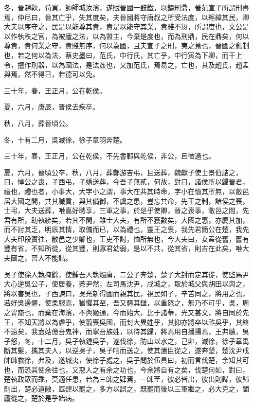 \begin{pinyinscope}
冬，晉趙鞅，荀寅，帥師城汝濱，遂賦晉國一鼓鐵，以鑄刑鼎，著范宣子所謂刑書焉，仲尼曰，晉其亡乎，失其度矣，夫晉國將守唐叔之所受法度，以經緯其民，卿大夫以序守之，民是以能尊其貴，貴是以能守其業，貴賤不愆，所謂度也，文公是以作執秩之官，為被廬之法，以為盟主，今棄是度也，而為刑鼎，民在鼎矣，何以尊貴，貴何業之守，貴賤無序，何以為國，且夫宣子之刑，夷之蒐也，晉國之亂制也，若之何以為法，蔡史墨曰，范氏，中行氏，其亡乎，中行寅為下卿，而干上令，擅作刑器，以為國法，是法姦也，又加范氏，焉易之，亡也，其及趙氏，趙孟與焉，然不得已，若德可以免。

三十年，春，王正月，公在乾侯。

夏，六月，庚辰，晉侯去疾卒。

秋，八月，葬晉頃公。

冬，十有二月，吳滅徐，徐子章羽奔楚。

三十年，春，王正月，公在乾侯，不先書鄆與乾侯，非公，且徵過也。

夏，六月，晉頃公卒，秋，八月，葬鄭游吉弔，且送葬，魏獻子使士景伯詰之，曰，悼公之喪，子西弔，子蟜送葬，今吾子無貳，何故，對曰，諸侯所以歸晉君，禮也，禮也者，小事大，大字小之謂，事大在共其時命，字小在恤其所無，以敝邑居大國之間，共其職貢，與其備御，不虞之患，豈忘共命，先王之制，諸侯之喪，士弔，大夫送葬，唯嘉好聘享，三軍之事，於是乎使卿，晉之喪事，敝邑之間，先君有所，助執紼矣，若其不間，雖士大夫，有所不獲數矣，大國之惠，亦慶其加，而不討其乏，明厎其情，取備而已，以為禮也，靈王之喪，我先君簡公在楚，我先大夫印段實往，敝邑之少卿也，王吏不討，恤所無也，今大夫曰，女盍從舊，舊有豐有省，不知所從，從其豐，則寡君幼弱，是以不共，從其省，則吉在此矣，唯大夫圖之，晉人不能詰。

吳子使徐人執掩餘，使鍾吾人執燭庸，二公子奔楚，楚子大封而定其徙，使監馬尹大心逆吳公子，使居養，莠尹然，左司馬沈尹，戌城之，取於城父與胡田以與之，將以害吳也，子西諫曰，吳光新得國而親其民，視民如子，辛苦同之，將用之也，若好吳邊疆，使柔服焉，猶懼其至，吾又疆其讎，以重怒之，無乃不可乎，吳，周之冑裔也，而棄在海濱，不與姬通，今而始大，比于諸華，光又甚文，將自同於先王，不知天將以為虐乎，使翦喪吳國，而封大異姓乎，其抑亦將卒以祚吳乎，其終不遠矣，我盍姑億吾鬼神，而寧吾族姓，以待其歸，將焉用自播揚焉，王弗聽，吳子怒，冬，十二月，吳子執鍾吳子，遂伐徐，防山以水之，己卯，滅徐，徐子章禹斷其髮，攜其夫人，以逆吳子，吳子唁而送之，使其邇臣從之，遂奔楚，楚沈尹戌帥師救徐，弗及，遂城夷，使徐子處之，吳子問於伍員曰，初而言伐楚，余知其可也，而恐其使余往也，又惡人之有余之功也，今余將自有之矣，伐楚何如，對曰，楚執政眾而乖，莫適任患，若為三師之肄焉，一師至，彼必皆出，彼出則歸，彼歸則出，楚必道敝，亟肄以罷之，多方以誤之，既罷而後以三軍繼之，必大克之，闔廬從之，楚於是乎始病。


\end{pinyinscope}
